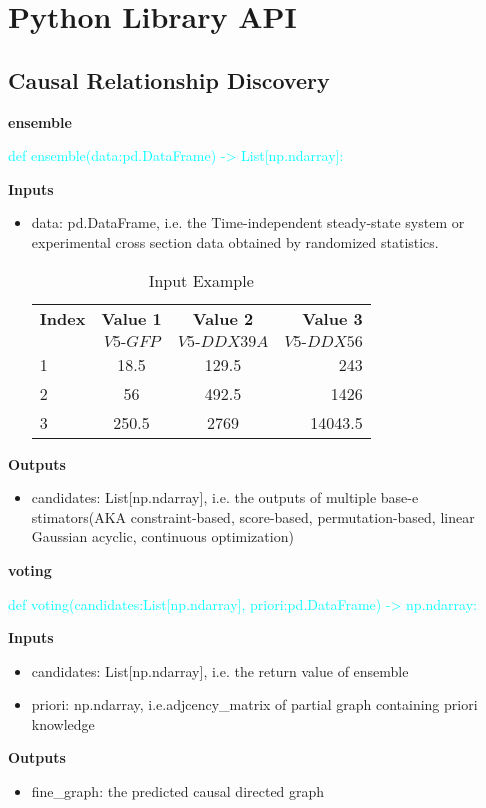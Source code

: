 \section{Python Library API}
\subsection{Causal Relationship Discovery}
\textbf{ensemble}
\par\textcolor{cyan}{def ensemble(data:pd.DataFrame) \mbox{->} List[np.ndarray]:}
\par\textbf{Inputs}
\begin{itemize}
    \item data: pd.DataFrame, i.e. the Time-independent steady-state system or experimental cross section data obtained by randomized statistics. 
    \begin{table}[ht!]
  \begin{center}
    \begin{tabular}{l|c|c|r} %
      \textbf{Index} & \textbf{Value 1} & \textbf{Value 2} & \textbf{Value 3}\\
      $ $ & $V5\mbox{-}GFP$ & $V5\mbox{-}DDX39A$ & $V5\mbox{-}DDX56$ \\
      \hline
      1 & 18.5 & 129.5 & 243\\
      2 & 56 & 492.5 & 1426\\
      3 & 250.5 & 2769 & 14043.5\\
    \end{tabular}
    \caption{Input Example}
  \end{center}
\end{table}
\end{itemize}
\par\textbf{Outputs}
\begin{itemize}
    \item candidates: List[np.ndarray], i.e. the outputs of multiple base-e stimators(AKA constraint-based, score-based, permutation-based, linear Gaussian acyclic, continuous optimization) 
\end{itemize}

\noindent\textbf{voting}
\par\textcolor{cyan}{def voting(candidates:List[np.ndarray], priori:pd.DataFrame) \mbox{->} np.ndarray:}
\par\textbf{Inputs}
\begin{itemize}
    \item candidates: List[np.ndarray], i.e. the return value of ensemble
    \item priori: np.ndarray, i.e.adjcency\_matrix of partial graph containing priori knowledge 
\end{itemize}
\par\textbf{Outputs}
\begin{itemize}
    \item fine\_graph: the predicted causal directed graph 
\end{itemize}

